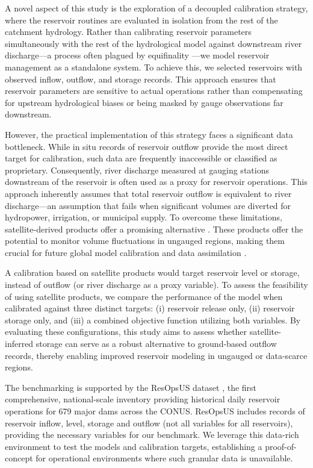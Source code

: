 \documentclass[hess, manuscript]{copernicus}
\begin{document}
A novel aspect of this study is the exploration of a decoupled calibration strategy, where the reservoir routines are evaluated in isolation from the rest of the catchment hydrology. Rather than calibrating reservoir parameters simultaneously with the rest of the hydrological model against downstream river discharge—a process often plagued by equifinality \citep{Beven2001}—we model reservoir management as a standalone system. To achieve this, we selected reservoirs with observed inflow, outflow, and storage records. This approach ensures that reservoir parameters are sensitive to actual operations rather than compensating for upstream hydrological biases or being masked by gauge observations far downstream.

However, the practical implementation of this strategy faces a significant data bottleneck. While in situ records of reservoir outflow provide the most direct target for calibration, such data are frequently inaccessible or classified as proprietary. Consequently, river discharge measured at gauging stations downstream of the reservoir is often used as a proxy for reservoir operations. This approach inherently assumes that total reservoir outflow is equivalent to river discharge—an assumption that fails when significant volumes are diverted for hydropower, irrigation, or municipal supply. To overcome these limitations, satellite-derived products offer a promising alternative \citep{Schwatke2015, Pekel2016, Schwatke2020, Donchyts2022, Khandelwal2022, Hao2024, Hou2024}. These products offer the potential to monitor volume fluctuations in ungauged regions, making them crucial for future global model calibration and data assimilation \citep{Hanazaki2022, Shen2025, Steyaert2025}.

A calibration based on satellite products would target reservoir level or storage, instead of outflow (or river discharge as a proxy variable). To assess the feasibility of using satellite products, we compare the performance of the model when calibrated against three distinct targets: (i) reservoir release only, (ii) reservoir storage only, and (iii) a combined objective function utilizing both variables. By evaluating these configurations, this study aims to assess whether satellite-inferred storage can serve as a robust alternative to ground-based outflow records, thereby enabling improved reservoir modeling in ungauged or data-scarce regions. 

The benchmarking is supported by the ResOpsUS dataset \citep{Steyaert2022, Steyaert2024}, the first comprehensive, national-scale inventory providing historical daily reservoir operations for 679 major dams across the CONUS. ResOpsUS includes records of reservoir inflow, level, storage and outflow (not all variables for all reservoirs), providing the necessary variables for our benchmark. We leverage this data-rich environment to test the models and calibration targets, establishing a proof-of-concept for operational environments where such granular data is unavailable.
\end{document}
